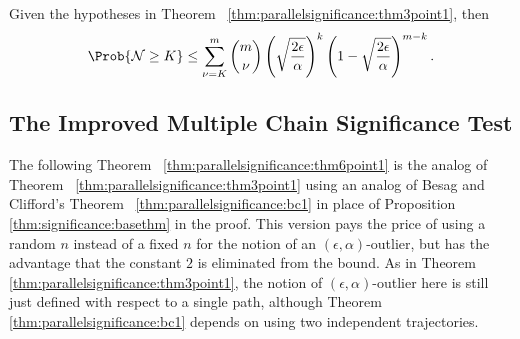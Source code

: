 \documentclass[12pt]{article}
\begin{document}
\begin{corollary}
    Given the hypotheses in Theorem~%
    \ref{thm:parallelsignificance:thm3point1}, then
    \[
        \Prob{\mathcal{N} \ge K} \le \sum\limits_{\nu=K}^m \binom{m}{\nu}
        \left( \sqrt{\frac{2\epsilon}{\alpha}} \right)^{k} \left( 1 -
        \sqrt{\frac{2\epsilon}{\alpha}} \right)^{m-k}.
    \]
\end{corollary}

\subsection*{The Improved Multiple Chain Significance Test}

The following Theorem~%
\ref{thm:parallelsignificance:thm6point1} is the analog of Theorem~%
\ref{thm:parallelsignificance:thm3point1} using an analog of Besag and
Clifford's Theorem~%
\ref{thm:parallelsignificance:bc1} in place of Proposition~%
\ref{thm:significance:basethm} in the proof.  This version pays the
price of using a random \( n \) instead of a fixed \( n \) for the
notion of an \( (\epsilon, \alpha) \)-outlier, but has the advantage
that the constant \( 2 \) is eliminated from the bound.  As in Theorem~%
\ref{thm:parallelsignificance:thm3point1}, the notion of \( (\epsilon,
\alpha) \)-outlier here is still just defined with respect to a single
path, although Theorem~%
\ref{thm:parallelsignificance:bc1} depends on using two independent
trajectories.
\end{document}
